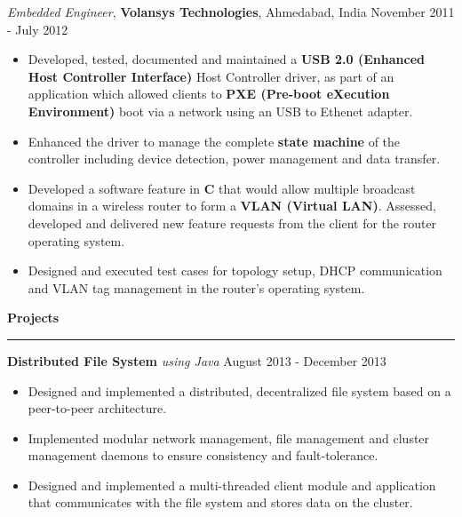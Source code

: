 \documentclass[10pt]{article}
\begin{document}
\textit{Embedded Engineer}, {\bf Volansys Technologies}, Ahmedabad, India \hfill November 2011 - July 2012
\begin{itemize}
    \item Developed, tested, documented and maintained a \textbf{USB 2.0 (Enhanced Host Controller Interface)} 
Host Controller driver, as part of an application which allowed clients to \textbf{PXE (Pre-boot eXecution Environment)} 
boot via a network using an USB to Ethenet adapter. 
    \item Enhanced the driver to manage the complete \textbf{state machine} of the controller 
including device detection, power management and data transfer. %
    \item Developed a software feature in \textbf{C} that would allow multiple broadcast domains in a wireless 
router to form a \textbf{VLAN (Virtual LAN)}. Assessed, developed and delivered new feature requests from the 
client for the router operating system.
    \item Designed and executed test cases for topology setup, DHCP communication and VLAN tag management in the router's operating system. 
\end{itemize}

\textbf{Projects}
\smallskip
\hrule
\textbf{Distributed File System} \textit{using Java} \hfill August 2013 - December 2013
\begin{itemize}
    \item Designed and implemented a distributed, decentralized file system based on a peer-to-peer architecture.
    \item Implemented modular network management, file management and cluster management daemons to ensure consistency and fault-tolerance.
    \item Designed and implemented a multi-threaded client module and application that communicates with the file system and stores data on the cluster.
\end{itemize}
\end{document}
